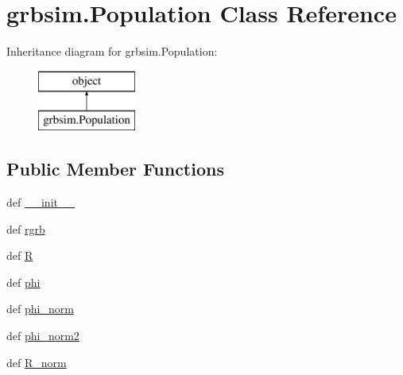 \hypertarget{classgrbsim_1_1_population}{\section{grbsim.\-Population Class Reference}
\label{classgrbsim_1_1_population}
}
Inheritance diagram for grbsim.\-Population\-:\begin{figure}[H]
\begin{center}
\leavevmode
\includegraphics[height=2.000000cm]{classgrbsim_1_1_population}
\end{center}
\end{figure}
\subsection*{Public Member Functions}
\begin{DoxyCompactItemize}
\item 
def \hyperlink{classgrbsim_1_1_population_a669b24d11e789de8c0f1082969d5f1e7}{\-\_\-\-\_\-init\-\_\-\-\_\-}
\item 
def \hyperlink{classgrbsim_1_1_population_af0b9b973b441194889c09073e5e473d4}{rgrb}
\item 
def \hyperlink{classgrbsim_1_1_population_a8d0cf186fe48e6ee48e4c3242ef2b47f}{R}
\item 
def \hyperlink{classgrbsim_1_1_population_a1dc31a9ab970799cbe6aeb485fe3eb9e}{phi}
\item 
def \hyperlink{classgrbsim_1_1_population_aa004fe972bb93a589685b1ea8f4855d7}{phi\-\_\-norm}
\item 
def \hyperlink{classgrbsim_1_1_population_a7e631a73173093618e561d34b730164b}{phi\-\_\-norm2}
\item 
def \hyperlink{classgrbsim_1_1_population_a9bd7c5802bc016a63987c541831cc21a}{R\-\_\-norm}
\end{DoxyCompactItemize}
